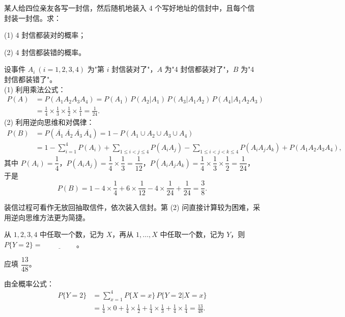 ﻿\documentclass[lang=cn,11pt]{elegantbook}
\begin{document}
\begin{exercise}\label{exer:1-13}
某人给四位亲友各写一封信，然后随机地装入 4 个写好地址的信封中，且每个信封装一封信。求：
\par
(1) 4 封信都装对的概率；\par
(2) 4 封信都装错的概率。
\end{exercise}
\begin{solution}
设事件 \(A_i\ (i=1,2,3,4)\) 为"第 \(i\) 封信装对了"，\(A\) 为"4 封信都装对了"，\(B\) 为"4 封信都装错了"。\\
(1) 利用乘法公式：
\[
\begin{aligned}
P(A) &= P(A_1 A_2 A_3 A_4) = P(A_1)\,P(A_2|A_1)\,P(A_3|A_1 A_2)\,P(A_4|A_1 A_2 A_3) \\
&= \frac{1}{4} \times \frac{1}{3} \times \frac{1}{2} \times \frac{1}{1} = \frac{1}{24}.
\end{aligned}
\]
(2) 利用逆向思维和对偶律：
\[
\begin{aligned}
P(B) &= P(\overline{A_1}\,\overline{A_2}\,\overline{A_3}\,\overline{A_4}) = 1 - P(A_1 \cup A_2 \cup A_3 \cup A_4) \\
&= 1 - \sum_{i=1}^{4} P(A_i) + \sum_{1 \le i < j \le 4} P(A_i A_j) - \sum_{1 \le i < j < k \le 4} P(A_i A_j A_k) + P(A_1 A_2 A_3 A_4),
\end{aligned}
\]
其中 \(P(A_i)=\dfrac{1}{4}\)，\(P(A_i A_j)=\dfrac{1}{4} \times \dfrac{1}{3}=\dfrac{1}{12}\)，\(P(A_i A_j A_k)=\dfrac{1}{4} \times \dfrac{1}{3} \times \dfrac{1}{2}=\dfrac{1}{24}\)，于是
\[
P(B) = 1 - 4 \times \frac{1}{4} + 6 \times \frac{1}{12} - 4 \times \frac{1}{24} + \frac{1}{24} = \frac{3}{8}.
\]
\end{solution}

\begin{note}
装信过程可看作无放回抽取信件，依次装入信封。第 (2) 问直接计算较为困难，采用逆向思维方法更为简捷。
\end{note}

\begin{exercise}\label{exer:1-14}
从 \(1, 2, 3, 4\) 中任取一个数，记为 \(X\)，再从 \(1, \dots, X\) 中任取一个数，记为 \(Y\)，则 \(P\{Y=2\}=\underline{\hspace{2cm}}\)。
\end{exercise}

\begin{solution}
应填 \(\dfrac{13}{48}\)。

由全概率公式：
\[
\begin{aligned}
P\{Y=2\} &= \sum_{x=1}^{4} P\{X=x\}\,P\{Y=2|X=x\} \\
&= \frac{1}{4} \times 0 + \frac{1}{4} \times \frac{1}{2} + \frac{1}{4} \times \frac{1}{3} + \frac{1}{4} \times \frac{1}{4} = \frac{13}{48}.
\end{aligned}
\]
\end{solution}
\end{document}
